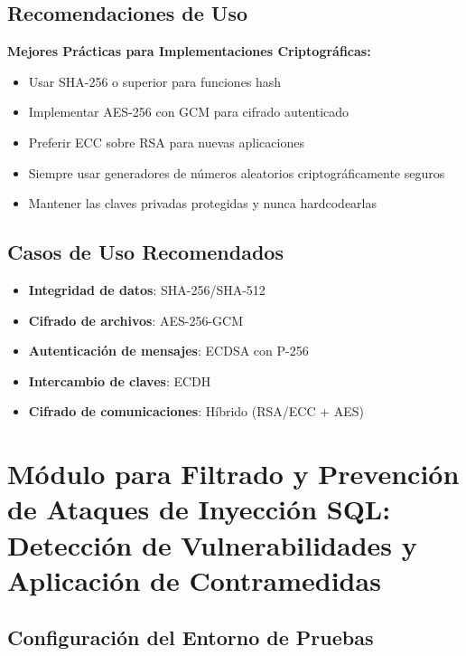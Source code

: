 \documentclass[12pt,a4paper]{article}
\begin{document}
\subsection{Recomendaciones de Uso}

\begin{securitygoodpractice}
    \textbf{Mejores Prácticas para Implementaciones Criptográficas:}
    \begin{itemize}
        \item Usar SHA-256 o superior para funciones hash
        \item Implementar AES-256 con GCM para cifrado autenticado
        \item Preferir ECC sobre RSA para nuevas aplicaciones
        \item Siempre usar generadores de números aleatorios criptográficamente seguros
        \item Mantener las claves privadas protegidas y nunca hardcodearlas
    \end{itemize}
\end{securitygoodpractice}

\subsection{Casos de Uso Recomendados}

\begin{itemize}
    \item \textbf{Integridad de datos}: SHA-256/SHA-512
    \item \textbf{Cifrado de archivos}: AES-256-GCM
    \item \textbf{Autenticación de mensajes}: ECDSA con P-256
    \item \textbf{Intercambio de claves}: ECDH
    \item \textbf{Cifrado de comunicaciones}: Híbrido (RSA/ECC + AES)
\end{itemize}

\section{Módulo para Filtrado y Prevención de Ataques de Inyección SQL: Detección de Vulnerabilidades y Aplicación de Contramedidas}

\subsection{Configuración del Entorno de Pruebas}
\end{document}
